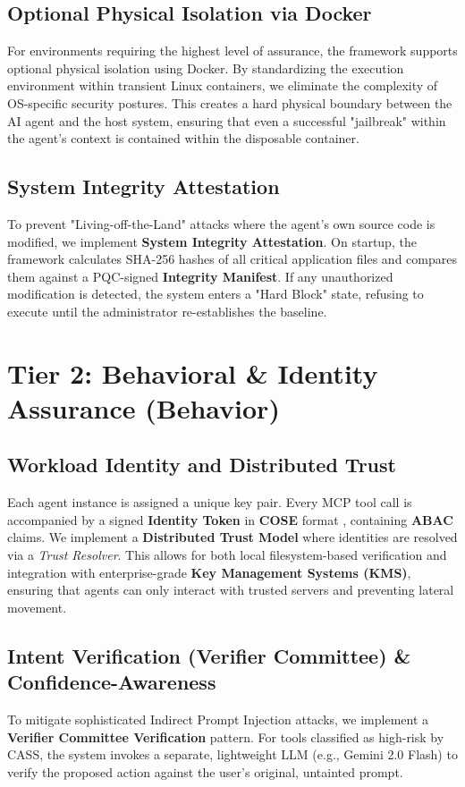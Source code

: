 \documentclass[conference]{IEEEtran}
\begin{document}
\subsection{Optional Physical Isolation via Docker}
For environments requiring the highest level of assurance, the framework supports optional physical isolation using Docker. By standardizing the execution environment within transient Linux containers, we eliminate the complexity of OS-specific security postures. This creates a hard physical boundary between the AI agent and the host system, ensuring that even a successful "jailbreak" within the agent's context is contained within the disposable container.

\subsection{System Integrity Attestation}
To prevent "Living-off-the-Land" attacks where the agent's own source code is modified, we implement \textbf{System Integrity Attestation}. On startup, the framework calculates SHA-256 hashes of all critical application files and compares them against a PQC-signed \textbf{Integrity Manifest}. If any unauthorized modification is detected, the system enters a "Hard Block" state, refusing to execute until the administrator re-establishes the baseline.

\section{Tier 2: Behavioral \& Identity Assurance (Behavior)}
\subsection{Workload Identity and Distributed Trust}
Each agent instance is assigned a unique key pair. Every MCP tool call is accompanied by a signed \textbf{Identity Token} in \textbf{COSE} format \cite{rfc9052}, containing \textbf{ABAC} claims. We implement a \textbf{Distributed Trust Model} where identities are resolved via a \textit{Trust Resolver}. This allows for both local filesystem-based verification and integration with enterprise-grade \textbf{Key Management Systems (KMS)}, ensuring that agents can only interact with trusted servers and preventing lateral movement.

\subsection{Intent Verification (Verifier Committee) \& Confidence-Awareness}
To mitigate sophisticated Indirect Prompt Injection attacks, we implement a \textbf{Verifier Committee Verification} pattern. For tools classified as high-risk by CASS, the system invokes a separate, lightweight LLM (e.g., Gemini 2.0 Flash) to verify the proposed action against the user's original, untainted prompt. 
\end{document}
